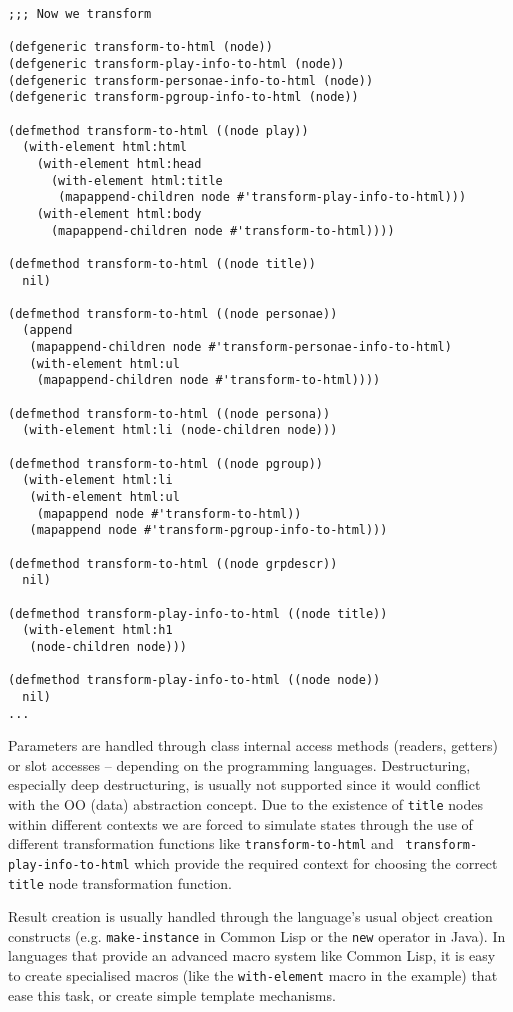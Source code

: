 \documentclass[a4paper,11pt]{scrartcl}
\begin{document}
\begin{verbatim}
;;; Now we transform

(defgeneric transform-to-html (node))
(defgeneric transform-play-info-to-html (node))
(defgeneric transform-personae-info-to-html (node))
(defgeneric transform-pgroup-info-to-html (node))

(defmethod transform-to-html ((node play))
  (with-element html:html
    (with-element html:head
      (with-element html:title 
       (mapappend-children node #'transform-play-info-to-html)))
    (with-element html:body
      (mapappend-children node #'transform-to-html))))

(defmethod transform-to-html ((node title))
  nil)

(defmethod transform-to-html ((node personae))
  (append
   (mapappend-children node #'transform-personae-info-to-html)
   (with-element html:ul
    (mapappend-children node #'transform-to-html))))

(defmethod transform-to-html ((node persona))
  (with-element html:li (node-children node)))

(defmethod transform-to-html ((node pgroup))
  (with-element html:li
   (with-element html:ul
    (mapappend node #'transform-to-html))
   (mapappend node #'transform-pgroup-info-to-html)))
   
(defmethod transform-to-html ((node grpdescr))
  nil)

(defmethod transform-play-info-to-html ((node title))
  (with-element html:h1
   (node-children node)))

(defmethod transform-play-info-to-html ((node node))
  nil)
...
\end{verbatim}

Parameters are handled through class internal access methods
(readers, getters) or slot accesses -- depending on the programming
languages. Destructuring, especially deep destructuring, is usually not
supported since it would conflict with the OO (data) abstraction
concept. Due to the existence of {\tt title} nodes within different
contexts we are forced to simulate states through the use of different
transformation functions like {\tt transform-to-html} and {\tt
  transform-play-info-to-html} which provide the required context for
choosing the correct {\tt title} node transformation function.

Result creation is usually handled through the language's usual object
creation constructs (e.g. \texttt{make-instance} in Common Lisp or the
\texttt{new} operator in Java).  In languages that provide an advanced
macro system like Common Lisp, it is easy to create specialised macros
(like the \texttt{with-element} macro in the example) that ease this
task, or create simple template mechanisms.
\end{document}
